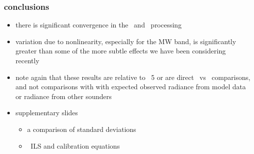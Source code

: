 \documentclass[11pt]{beamer}
\begin{document}
\begin{frame}
\frametitle{conclusions}

\begin{itemize}

  \item there is significant convergence in the \ccast\ and
    \noaa\ processing

  \item variation due to nonlinearity, especially for the MW band, is
    significantly greater than some of the more subtle effects we have
    been considering recently

  \item note again that these results are relative to \fov\ 5 or are
    direct \noaa\ vs \ccast\ comparisons, and not comparisons with
    with expected observed radiance from model data or radiance from
    other sounders

  \vspace{6mm}

  \item supplementary slides
    \begin{itemize}
      \item a comparison of standard deviations
      \item \ccast\ ILS and calibration equations
    \end{itemize}
\end{itemize}

\end{frame}

\end{document}
